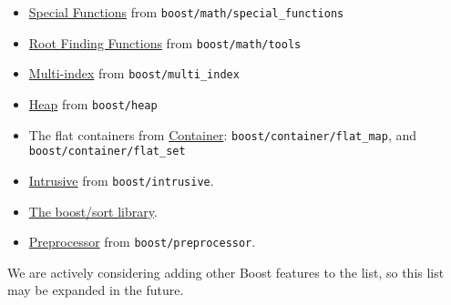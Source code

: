 \begin{itemize}
\item \href{https://www.boost.org/libs/math/doc/html/special.html}{Special Functions} from \texttt{boost/math/special_functions}
\item \href{https://www.boost.org/libs/math/doc/html/root_finding.html}{Root Finding Functions} from \texttt{boost/math/tools}
\item \href{https://www.boost.org/libs/multi_index/}{Multi-index} from \texttt{boost/multi_index}
\item \href{https://www.boost.org/libs/heap/}{Heap} from \texttt{boost/heap}
\item The flat containers from \href{https://www.boost.org/libs/container/}{Container}: \texttt{boost/container/flat_map}, and \texttt{boost/container/flat_set}
\item \href{https://www.boost.org/libs/intrusive/}{Intrusive} from \texttt{boost/intrusive}.
\item \href{https://www.boost.org/libs/sort/}{The boost/sort library}.
\item \href{https://www.boost.org/libs/preprocessor/}{Preprocessor} from \texttt{boost/preprocessor}.
\end{itemize}
We are actively considering adding other Boost features to the list, so this list may be expanded in the future.

